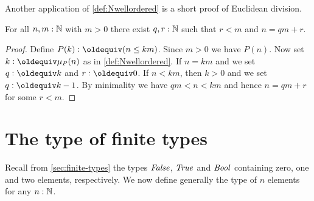 Another application of \cref{def:Nwellordered} is a
short proof of Euclidean division. 
\begin{lemma}\label{lem:euclid-div}
For all $n,m:\mathbb{N}$ with $m>0$ there exist $q,r:\mathbb{N}$ such that $r<m$ and $n=qm+r$.
\end{lemma}
\begin{proof}
Define $P(k)\defeq (n\leq km)$. Since $m>0$ we have $P(n)$.
Now set $k\defeq\mu_P(n)$ as in \cref{def:Nwellordered}.
If $n=km$ and we set $q\defeq k$ and $r\defeq 0$.
If $n<km$, then $k>0$ and we set $q\defeq k-1$.
By minimality we have $qm<n<km$ and hence $n=qm+r$ for some $r<m$.
\end{proof}

\section{The type of finite types}
\label{sec:typeFin}
Recall from \cref{sec:finite-types} the types
$\mathop{\mathit{False}}$, $\mathop{\mathit{True}}$ and $\mathop{\mathit{Bool}}$ containing zero, one and two
elements, respectively. We now define generally the
type of $n$ elements for any $n:\mathbb{N}$.

